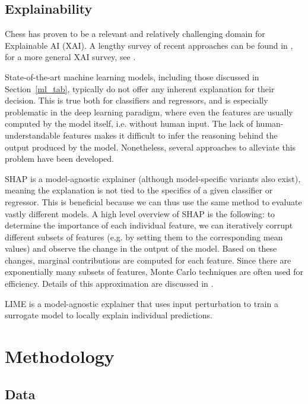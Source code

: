 \documentclass[sigconf,nonacm]{acmart}
\begin{document}
\subsection{Explainability}

Chess has proven to be a relevant and relatively challenging domain for Explainable AI (XAI). A lengthy survey of recent approaches can be found in \cite{xaichesssurvey}, for a more general XAI survey, see \cite{xaisurvey}. 

State-of-the-art machine learning models, including those discussed in Section~\ref{ml_tab}, typically do not offer any inherent explanation for their decision. This is true both for classifiers and regressors, and is especially problematic in the deep learning paradigm, where even the features are usually computed by the model itself, i.e. without human input. The lack of human-understandable features makes it difficult to infer the reasoning behind the output produced by the model. Nonetheless, several approaches to alleviate this problem have been developed. 

SHAP \cite{shap} is a model-agnostic explainer (although model-specific variants also exist), meaning the explanation is not tied to the specifics of a given classifier or regressor. This is beneficial because we can thus use the same method to evaluate vastly different models. A high level overview of SHAP is the following: to determine the importance of each individual feature, we can iteratively corrupt different subsets of features (e.g. by setting them to the corresponding mean values) and observe the change in the output of the model. Based on these changes, marginal contributions are computed for each feature. Since there are exponentially many subsets of features, Monte Carlo techniques are often used for efficiency. Details of this approximation are discussed in \cite{shapopt}. 

LIME \cite{lime} is a model-agnostic explainer that uses input perturbation to train a surrogate model to locally explain individual predictions. 

\section{Methodology}

\subsection{Data}
\end{document}
